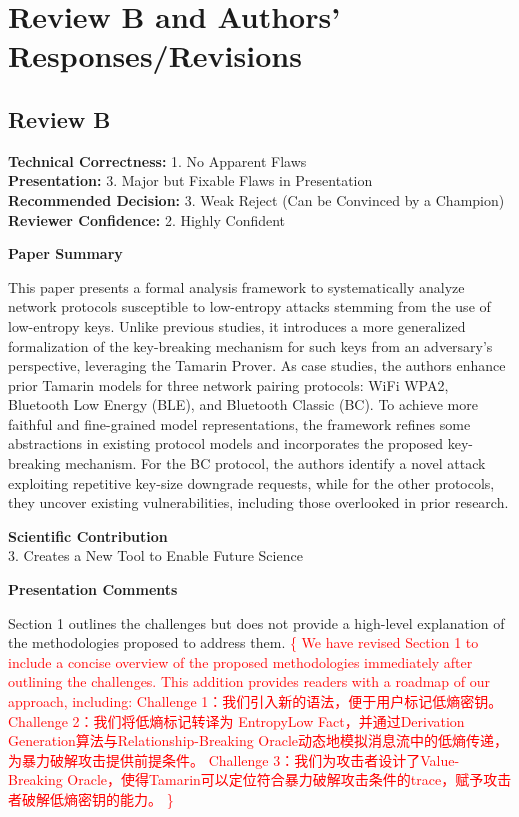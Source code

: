 \documentclass{article}
\newcommand{\response}[1]{\textcolor{red}{\{#1\}}}
\begin{document}
\section{Review B and Authors' Responses/Revisions}
\subsection{Review B}

\noindent\textbf{Technical Correctness:} 1. No Apparent Flaws\\
\textbf{Presentation:} 3. Major but Fixable Flaws in Presentation\\
\textbf{Recommended Decision:} 3. Weak Reject (Can be Convinced by a Champion)\\
\textbf{Reviewer Confidence:} 2. Highly Confident

\rule{0pt}{8pt}

\noindent\textbf{Paper Summary}

This paper presents a formal analysis framework to systematically analyze network protocols susceptible to low-entropy attacks stemming from the use of low-entropy keys. 
Unlike previous studies, it introduces a more generalized formalization of the key-breaking mechanism for such keys from an adversary's perspective, leveraging the Tamarin Prover. 
As case studies, the authors enhance prior Tamarin models for three network pairing protocols: WiFi WPA2, Bluetooth Low Energy (BLE), and Bluetooth Classic (BC). 
To achieve more faithful and fine-grained model representations, the framework refines some abstractions in existing protocol models and incorporates the proposed key-breaking mechanism. 
For the BC protocol, the authors identify a novel attack exploiting repetitive key-size downgrade requests, while for the other protocols, they uncover existing vulnerabilities, including those overlooked in prior research.

\rule{0pt}{8pt}

\noindent\textbf{Scientific Contribution}\\
3. Creates a New Tool to Enable Future Science

\rule{0pt}{8pt}

\noindent\textbf{Presentation Comments}

Section 1 outlines the challenges but does not provide a high-level explanation of the methodologies proposed to address them.
\response{
    We have revised Section 1 to include a concise overview of the proposed methodologies immediately after outlining the challenges. 
    This addition provides readers with a roadmap of our approach, including:
        Challenge 1：我们引入新的语法，便于用户标记低熵密钥。
        Challenge 2：我们将低熵标记转译为 EntropyLow Fact，并通过Derivation Generation算法与Relationship-Breaking Oracle动态地模拟消息流中的低熵传递，为暴力破解攻击提供前提条件。
        Challenge 3：我们为攻击者设计了Value-Breaking Oracle，使得Tamarin可以定位符合暴力破解攻击条件的trace，赋予攻击者破解低熵密钥的能力。
}
\end{document}
